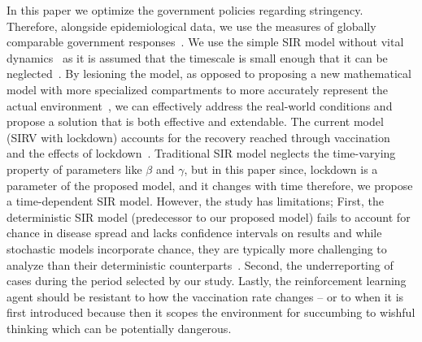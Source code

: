 \documentclass[tikz,fleqn,12pt]{wlscirep}
\begin{document}
In this paper we optimize the government policies regarding stringency. Therefore, alongside epidemiological data, we use the measures of globally comparable government responses~\cite{Hale2021}. We use the simple SIR model without vital dynamics~\cite{Hethcote1989, Hethcote2008, ALLEN2017128} as it is assumed that the timescale is small enough that it can be neglected~\cite{Cooper2020}. By lesioning the model, as opposed to proposing a new mathematical model with more specialized compartments to more accurately represent the actual environment~\cite{Bjrnstad2020, Mwalili2020}, we can effectively address the real-world conditions and propose a solution that is both effective and extendable. The current model (SIRV with lockdown) accounts for the recovery reached through vaccination~\cite{Marinov2022,MaurciodeCarvalho2023,Thater,Turkyilmazoglu2022,YALADANDA2022101052} and the effects of lockdown~\cite{SIRLockdown,NBERw26981,NBERw26867}. Traditional SIR model neglects the time-varying property of parameters like $\beta$ and $\gamma$, but in this paper since, lockdown is a parameter of the proposed model, and it changes with time therefore, we propose a time-dependent SIR model\cite{TimeDependentSIR}. However, the study has limitations; First, the deterministic SIR model (predecessor to our proposed model) fails to account for chance in disease spread and lacks confidence intervals on results and while stochastic models incorporate chance, they are typically more challenging to analyze than their deterministic counterparts~\cite{Hethcote2008}. Second, the underreporting of cases during the period selected by our study. Lastly, the reinforcement learning agent should be resistant to how the vaccination rate changes -- or to when it is first introduced because then it scopes the environment for succumbing to wishful thinking which can be  potentially dangerous.
\end{document}
